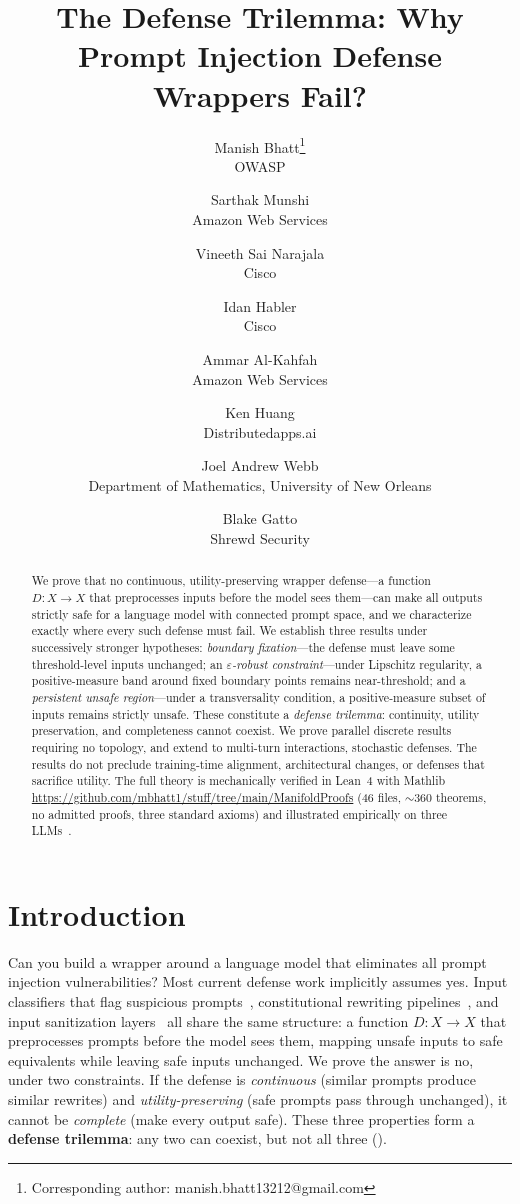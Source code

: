 \documentclass[11pt]{article}
\title{The Defense Trilemma: Why Prompt Injection Defense Wrappers Fail?}
\author{
    {\rm Manish Bhatt\thanks{Corresponding author: manish.bhatt13212@gmail.com}}\hspace{0.5em}\footnotemark[2]\\
    OWASP
    \and
    {\rm Sarthak Munshi}\footnotemark[2]\\
    Amazon Web Services
  \and
  {\rm Vineeth Sai Narajala}\footnotemark[2]\\
  Cisco
  \and
  {\rm Idan Habler}\footnotemark[2]\\
  Cisco
  \and
  {\rm Ammar Al-Kahfah}\footnotemark[2]\\
  Amazon Web Services
  \and
  {\rm Ken Huang}\\
  Distributedapps.ai
  \and
  {\rm Joel Andrew Webb}\\
  Department of Mathematics, University of New Orleans
  \and
  {\rm Blake Gatto}\\
  Shrewd Security
  }
\date{}
\begin{document}
\maketitle
\renewcommand{\thefootnote}{\fnsymbol{footnote}}
\begin{abstract}
We prove that no continuous, utility-preserving wrapper defense---a
function $D\colon X\to X$ that preprocesses inputs before the model
sees them---can make all outputs strictly safe for a language model
with connected prompt space, and we characterize exactly where every
such defense must fail. We establish three results under
successively stronger hypotheses: \emph{boundary fixation}---the defense must leave some
threshold-level inputs unchanged; an \emph{$\varepsilon$-robust
constraint}---under Lipschitz regularity, a positive-measure band
around fixed boundary points remains near-threshold; and a
\emph{persistent unsafe region}---under a transversality condition, a
positive-measure subset of inputs remains strictly unsafe. These
constitute a \emph{defense trilemma}: continuity, utility preservation,
and completeness cannot coexist. We prove parallel discrete results
requiring no topology, and extend to multi-turn interactions,
stochastic defenses. The results do not
preclude training-time alignment, architectural changes, or defenses
that sacrifice utility. The full theory is mechanically verified in
Lean~4 with Mathlib
\url{https://github.com/mbhatt1/stuff/tree/main/ManifoldProofs}
(46 files, ${\sim}360$ theorems, no admitted proofs, three standard
axioms) and illustrated empirically on three LLMs~\cite{munshi2026manifold}.
\end{abstract}


\section{Introduction}
\label{sec:intro}

Can you build a wrapper around a language model that eliminates all
prompt injection vulnerabilities? Most current defense work implicitly
assumes yes. Input classifiers that flag suspicious
prompts~\cite{alon2023detecting}, constitutional rewriting
pipelines~\cite{bai2022constitutional}, and input sanitization
layers~\cite{inan2023llama} all share the same structure: a
function $D\colon X \to X$ that preprocesses prompts before the model
sees them, mapping unsafe inputs to safe equivalents while leaving safe
inputs unchanged. We prove the answer is no, under two constraints. If the defense
is \emph{continuous} (similar prompts produce similar rewrites) and
\emph{utility-preserving} (safe prompts pass through unchanged), it
cannot be \emph{complete} (make every output safe). These three
properties form a \textbf{defense trilemma}: any two can coexist, but
not all three ().
\end{document}
